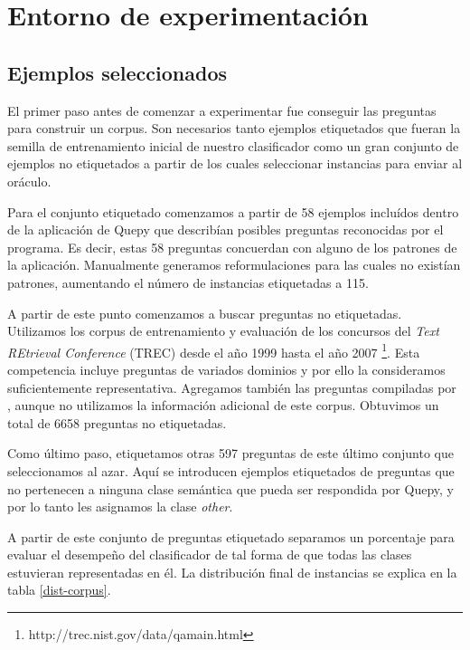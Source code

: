 

\chapter{Entorno de experimentación}

\section{Ejemplos seleccionados}\label{descripcion-corpus}

El primer paso antes de comenzar a experimentar fue conseguir las preguntas para construir un corpus. Son necesarios tanto ejemplos etiquetados que fueran la semilla de entrenamiento inicial de nuestro clasificador como un gran conjunto de ejemplos no etiquetados a partir de los cuales seleccionar instancias para enviar al oráculo.

Para el conjunto etiquetado comenzamos a partir de 58 ejemplos incluídos dentro de la aplicación de Quepy que describían posibles preguntas reconocidas por el programa. Es decir, estas 58 preguntas concuerdan con alguno de los patrones de la aplicación. Manualmente generamos reformulaciones para las cuales no existían patrones, aumentando el número de instancias etiquetadas a 115.

A partir de este punto comenzamos a buscar preguntas no etiquetadas. Utilizamos los corpus de entrenamiento y evaluación de los concursos del \textit{Text REtrieval Conference} (TREC) desde el año 1999 hasta el año 2007 \footnote{http://trec.nist.gov/data/qamain.html}. Esta competencia incluye preguntas de variados dominios y por ello la consideramos suficientemente representativa. Agregamos también las preguntas compiladas por \citet{corpus-stanford}, aunque no utilizamos la información adicional de este corpus. Obtuvimos un total de 6658 preguntas no etiquetadas.

Como último paso, etiquetamos otras 597 preguntas de este último conjunto que seleccionamos al azar. Aquí se introducen ejemplos etiquetados de preguntas que no pertenecen a ninguna clase semántica que pueda ser respondida por Quepy, y por lo tanto les asignamos la clase \textit{other}.

A partir de este conjunto de preguntas etiquetado separamos un porcentaje para evaluar el desempeño del clasificador de tal forma de que todas las clases estuvieran representadas en él. La distribución final de instancias se explica en la tabla \ref{dist-corpus}.

